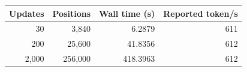 \begin{tabular}{rrrr}
\toprule
Updates & Positions & Wall time (s) & Reported token/s \\
\midrule
30 & 3,840 & 6.2879 & 611 \\
200 & 25,600 & 41.8356 & 612 \\
2,000 & 256,000 & 418.3963 & 612 \\
\bottomrule
\end{tabular}
